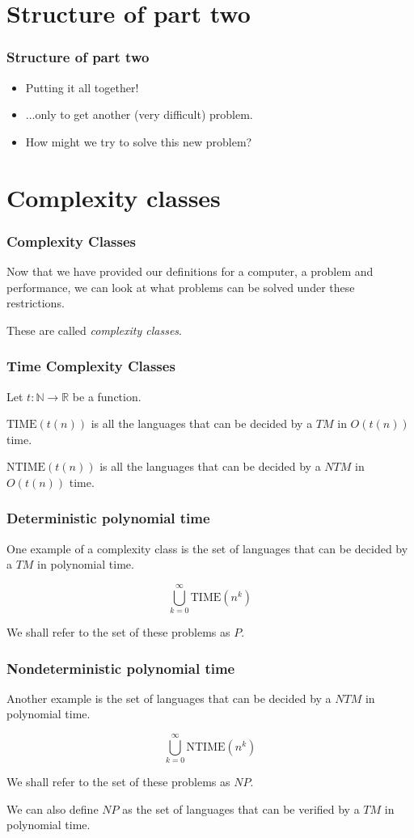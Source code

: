 \documentclass[aspectratio=169]{beamer}
\begin{document}
\section{Structure of part two}

\begin{frame}
\frametitle{Structure of part two}
\begin{itemize}
    \item Putting it all together!
    \item ...only to get another (very difficult) problem.
    \item How might we try to solve this new problem?
\end{itemize}
\end{frame}

\section{Complexity classes}

\begin{frame}
\frametitle{Complexity Classes}
Now that we have provided our definitions for a computer, a problem and performance, we can look at what problems can be solved under these restrictions.

These are called {\em complexity classes}.
\end{frame}

\begin{frame}
\frametitle{Time Complexity Classes}
Let $t: \mathbb{N} \to \mathbb{R}$ be a function.

$\mathrm{TIME}(t(n))$ is all the languages that can be decided by a $TM$ in $O(t(n))$ time.

$\mathrm{NTIME}(t(n))$ is all the languages that can be decided by a $NTM$ in $O(t(n))$ time.
\end{frame}

\begin{frame}
\frametitle{Deterministic polynomial time}
One example of a complexity class is the set of languages that can be decided by a $TM$ in polynomial time.

$$\bigcup_{k = 0}^{\infty} \mathrm{TIME}(n^k)$$

We shall refer to the set of these problems as $P$.
\end{frame}

\begin{frame}
\frametitle{Nondeterministic polynomial time}
Another example is the set of languages that can be decided by a $NTM$ in polynomial time.

$$\bigcup_{k = 0}^{\infty} \mathrm{NTIME}(n^k)$$

We shall refer to the set of these problems as $NP$.

We can also define $NP$ as the set of languages that can be verified by a $TM$ in polynomial time.
\end{frame}
\end{document}

